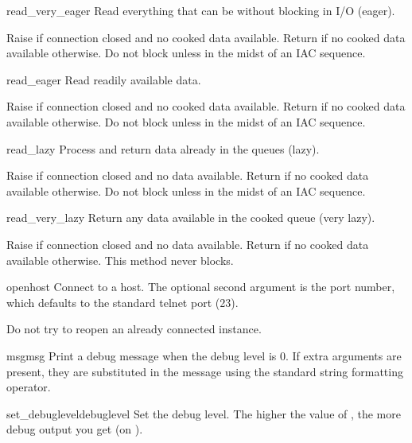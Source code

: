 \begin{methoddesc}{read_very_eager}{}
Read everything that can be without blocking in I/O (eager).

Raise  if connection closed and no cooked data
available.  Return  if no cooked data available otherwise.
Do not block unless in the midst of an IAC sequence.
\end{methoddesc}

\begin{methoddesc}{read_eager}{}
Read readily available data.

Raise  if connection closed and no cooked data
available.  Return  if no cooked data available otherwise.
Do not block unless in the midst of an IAC sequence.
\end{methoddesc}

\begin{methoddesc}{read_lazy}{}
Process and return data already in the queues (lazy).

Raise  if connection closed and no data available.
Return  if no cooked data available otherwise.  Do not block
unless in the midst of an IAC sequence.
\end{methoddesc}

\begin{methoddesc}{read_very_lazy}{}
Return any data available in the cooked queue (very lazy).

Raise  if connection closed and no data available.
Return  if no cooked data available otherwise.  This method
never blocks.
\end{methoddesc}

\begin{methoddesc}{open}{host}
Connect to a host.
The optional second argument is the port number, which
defaults to the standard telnet port (23).

Do not try to reopen an already connected instance.
\end{methoddesc}

\begin{methoddesc}{msg}{msg}
Print a debug message when the debug level is \code{>} 0.
If extra arguments are present, they are substituted in the
message using the standard string formatting operator.
\end{methoddesc}

\begin{methoddesc}{set_debuglevel}{debuglevel}
Set the debug level.  The higher the value of , the
more debug output you get (on ).
\end{methoddesc}

